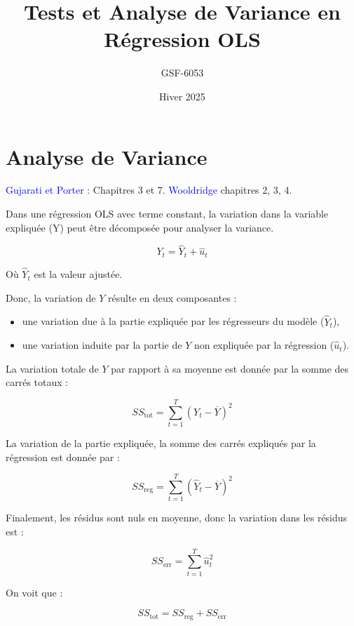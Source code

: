 \documentclass[14pt]{extarticle} %
\title{\textbf{Tests et Analyse de Variance en Régression OLS}}
\author{GSF-6053}
\date{Hiver 2025}
\theoremstyle{definition}
\theoremstyle{plain}
\newcommand{\livre}[1]{\textcolor{blue}{#1}}
\begin{document}
\maketitle

\tableofcontents
\newpage

\onehalfspacing

\section{Analyse de Variance}

\livre{Gujarati et Porter} : Chapitres 3 et 7. \livre{Wooldridge} chapitres 2, 3, 4.

Dans une régression OLS avec terme constant, la variation dans la variable expliquée (Y) peut être décomposée pour analyser la variance.

\[
Y_t = \hat{Y}_t + \hat{u}_t
\]

Où $\hat{Y}_t$ est la valeur ajustée.

Donc, la variation de $Y$ résulte en deux composantes :

\begin{itemize}
    \item une variation due à la partie expliquée par les régresseurs du modèle ($\hat{Y}_t$),
    \item une variation induite par la partie de $Y$ non expliquée par la régression ($\hat{u}_t$).
\end{itemize}

La variation totale de $Y$ par rapport à sa moyenne est donnée par la somme des carrés totaux :

\[
SS_{\text{tot}} = \sum_{t=1}^{T} (Y_t - \overline{Y})^2
\]

La variation de la partie expliquée, la somme des carrés expliqués par la régression est donnée par :

\[
SS_{\text{reg}} = \sum_{t=1}^{T} (\hat{Y}_t - \overline{Y})^2
\]

Finalement, les résidus sont nuls en moyenne, donc la variation dans les résidus est :

\[
SS_{\text{err}} = \sum_{t=1}^{T} \hat{u}_t^2
\]

On voit que :

\[
SS_{\text{tot}} = SS_{\text{reg}} + SS_{\text{err}}
\]
\end{document}
